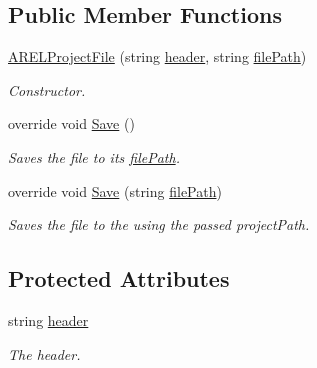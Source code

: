 \subsection*{Public Member Functions}
\begin{DoxyCompactItemize}
\item 
\hyperlink{class_a_rdev_kit_1_1_model_1_1_project_1_1_file_1_1_a_r_e_l_project_file_a9b94a89662d8c29e26f6fcb98d40e332}{A\-R\-E\-L\-Project\-File} (string \hyperlink{class_a_rdev_kit_1_1_model_1_1_project_1_1_file_1_1_a_r_e_l_project_file_aa23070e2b62c07d4c41a5555ab673326}{header}, string \hyperlink{class_a_rdev_kit_1_1_model_1_1_project_1_1_file_1_1_abstract_file_ad879e3a81860da8b72f2d9f61a18ab3b}{file\-Path})
\begin{DoxyCompactList}\small\item\em Constructor. \end{DoxyCompactList}\item 
override void \hyperlink{class_a_rdev_kit_1_1_model_1_1_project_1_1_file_1_1_a_r_e_l_project_file_a021507cbd83b07773ffc1caf0645ca49}{Save} ()
\begin{DoxyCompactList}\small\item\em Saves the file to its \hyperlink{class_a_rdev_kit_1_1_model_1_1_project_1_1_file_1_1_abstract_file_ad879e3a81860da8b72f2d9f61a18ab3b}{file\-Path}. \end{DoxyCompactList}\item 
override void \hyperlink{class_a_rdev_kit_1_1_model_1_1_project_1_1_file_1_1_a_r_e_l_project_file_aa187897624d6d836b3a76331069d5bee}{Save} (string \hyperlink{class_a_rdev_kit_1_1_model_1_1_project_1_1_file_1_1_abstract_file_ad879e3a81860da8b72f2d9f61a18ab3b}{file\-Path})
\begin{DoxyCompactList}\small\item\em Saves the file to the using the passed project\-Path. \end{DoxyCompactList}\end{DoxyCompactItemize}
\subsection*{Protected Attributes}
\begin{DoxyCompactItemize}
\item 
string \hyperlink{class_a_rdev_kit_1_1_model_1_1_project_1_1_file_1_1_a_r_e_l_project_file_aa23070e2b62c07d4c41a5555ab673326}{header}
\begin{DoxyCompactList}\small\item\em The header. \end{DoxyCompactList}\end{DoxyCompactItemize}

